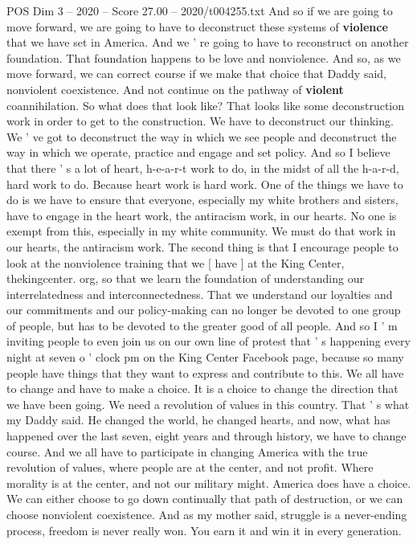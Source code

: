 \begin{textsample}{POS Dim 3 – 2020 – Score 27.00 – 2020/t004255.txt}
And so if we are going to move forward, we are going to have to deconstruct these systems of \textbf{violence} that we have set in America.
And we ' re going to have to reconstruct on another foundation.
That foundation happens to be love and nonviolence.
And so, as we move forward, we can correct course if we make that choice that Daddy said, nonviolent coexistence.
And not continue on the pathway of \textbf{violent} coannihilation.
So what does that look like?
That looks like some deconstruction work in order to get to the construction.
We have to deconstruct our thinking.
We ' ve got to deconstruct the way in which we see people and deconstruct the way in which we operate, practice and engage and set policy.
And so I believe that there ' s a lot of heart, h-e-a-r-t work to do, in the midst of all the h-a-r-d, hard work to do.
Because heart work is hard work.
One of the things we have to do is we have to ensure that everyone, especially my white brothers and sisters, have to engage in the heart work, the antiracism work, in our hearts.
No one is exempt from this, especially in my white community.
We must do that work in our hearts, the antiracism work.
The second thing is that I encourage people to look at the nonviolence training that we [ have ] at the King Center, thekingcenter. org, so that we learn the foundation of understanding our interrelatedness and interconnectedness.
That we understand our loyalties and our commitments and our policy-making can no longer be devoted to one group of people, but has to be devoted to the greater good of all people.
And so I ' m inviting people to even join us on our own line of protest that ' s happening every night at seven o ' clock pm on the King Center Facebook page, because so many people have things that they want to express and contribute to this.
We all have to change and have to make a choice.
It is a choice to change the direction that we have been going.
We need a revolution of values in this country.
That ' s what my Daddy said.
He changed the world, he changed hearts, and now, what has happened over the last seven, eight years and through history, we have to change course.
And we all have to participate in changing America with the true revolution of values, where people are at the center, and not profit.
Where morality is at the center, and not our military might.
America does have a choice.
We can either choose to go down continually that path of destruction, or we can choose nonviolent coexistence.
And as my mother said, struggle is a never-ending process, freedom is never really won.
You earn it and win it in every generation.

\end{textsample}
